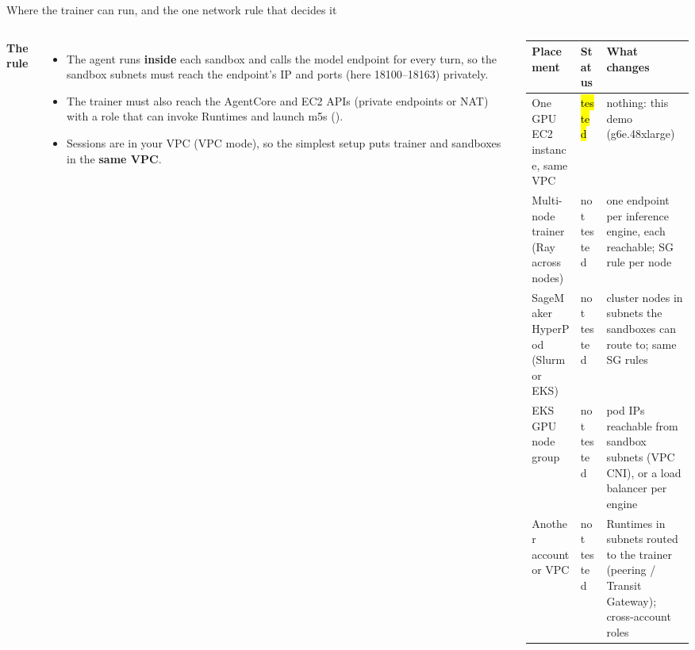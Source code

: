 \begin{frame}{Where the trainer can run, and the one network rule that decides it}
\begin{columns}[T]
\textbf{\footnotesize The rule}
\begin{itemize}\scriptsize\setlength{\itemsep}{0.8mm}
\item The agent runs \textbf{inside} each sandbox and calls the model endpoint for every turn, so the sandbox subnets must reach the endpoint's IP and ports (here 18100--18163) privately.
\item The trainer must also reach the AgentCore and EC2 APIs (private endpoints or NAT) with a role that can invoke Runtimes and launch m5s ().
\item Sessions are in your VPC (VPC mode), so the simplest setup puts trainer and sandboxes in the \textbf{same VPC}.
\end{itemize}
\tiny\setlength{\tabcolsep}{3pt}
\begin{tabularx}{\linewidth}{@{}P{0.30\linewidth}P{0.16\linewidth}Y@{}}
\toprule
\textbf{Placement} & \textbf{Status} & \textbf{What changes}\\
\midrule
One GPU EC2 instance, same VPC & \hl{tested} & nothing: this demo (g6e.48xlarge)\\
Multi-node trainer (Ray across nodes) & not tested & one endpoint per inference engine, each reachable; SG rule per node\\
SageMaker HyperPod (Slurm or EKS) & not tested & cluster nodes in subnets the sandboxes can route to; same SG rules\\
EKS GPU node group & not tested & pod IPs reachable from sandbox subnets (VPC CNI), or a load balancer per engine\\
Another account or VPC & not tested & Runtimes in subnets routed to the trainer (peering / Transit Gateway); cross-account roles\\
\bottomrule
\end{tabularx}
\end{columns}
\par\vspace{2mm}
\end{frame}

